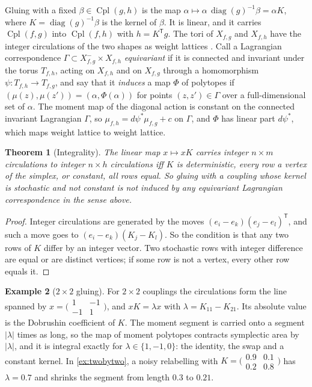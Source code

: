 \documentclass[11pt]{article}
\newtheorem{theorem}{Theorem}[section]
\theoremstyle{definition}
\newtheorem{example}[theorem]{Example}
\theoremstyle{remark}
\newcommand{\Cpl}{\operatorname{Cpl}}
\newcommand{\diag}{\operatorname{diag}}
\newcommand{\T}{\mathsf T}
\begin{document}
Gluing with a fixed $\beta\in\Cpl(g,h)$ is the map $\alpha\mapsto\alpha\,\diag(g)^{-1}\beta=\alpha K$, where $K=\diag(g)^{-1}\beta$ is the
kernel of $\beta$. It is linear, and it carries $\Cpl(f,g)$ into $\Cpl(f,h)$ with $h=K^\T g$. The tori of $X_{f,g}$ and $X_{f,h}$ have the
integer circulations of the two shapes as weight lattices \cite[Thm.~6.4]{Conditionals}. Call a Lagrangian correspondence
$\Gamma\subset X_{f,g}^-\times X_{f,h}$ \emph{equivariant} if it is connected and invariant under the torus $T_{f,h}$, acting on $X_{f,h}$ and on
$X_{f,g}$ through a homomorphism $\psi\colon T_{f,h}\to T_{f,g}$, and say that it \emph{induces} a map $\Phi$ of polytopes if
$(\mu(z),\mu(z'))=(\alpha,\Phi(\alpha))$ for points $(z,z')\in\Gamma$ over a full-dimensional set of $\alpha$. The moment map of the diagonal
action is constant on the connected invariant Lagrangian $\Gamma$, so $\mu_{f,h}=d\psi^*\mu_{f,g}+c$ on $\Gamma$, and $\Phi$ has linear part
$d\psi^*$, which maps weight lattice to weight lattice.

\begin{theorem}[Integrality]\label{thm:integral}
The linear map $x\mapsto xK$ carries integer $n\times m$ circulations to integer $n\times h$ circulations iff $K$ is deterministic,
every row a vertex of the simplex, or constant, all rows equal. So gluing with a coupling whose kernel is stochastic and not constant
is not induced by any equivariant Lagrangian correspondence in the sense above.
\end{theorem}
\begin{proof}
Integer circulations are generated by the moves $(e_i-e_k)(e_j-e_l)^\T$, and such a move goes to $(e_i-e_k)(K_j-K_l)$. So the condition is
that any two rows of $K$ differ by an integer vector. Two stochastic rows with integer difference are equal or are distinct vertices;
if some row is not a vertex, every other row equals it.
\end{proof}

\begin{example}[$2\times2$ gluing]\label{ex:gluetwo}
For $2\times2$ couplings the circulations form the line spanned by $x=\bigl(\begin{smallmatrix}1&-1\\-1&1\end{smallmatrix}\bigr)$, and
$xK=\lambda x$ with $\lambda=K_{11}-K_{21}$. Its absolute value is the Dobrushin coefficient of $K$. The moment segment is carried onto a
segment $\lvert\lambda\rvert$ times as long, so the map of moment polytopes contracts symplectic area by $\lvert\lambda\rvert$, and it is integral
exactly for $\lambda\in\{1,-1,0\}$: the identity, the swap and a constant kernel. In \cref{ex:twobytwo}, a noisy relabelling with
$K=\bigl(\begin{smallmatrix}0.9&0.1\\0.2&0.8\end{smallmatrix}\bigr)$ has $\lambda=0.7$ and shrinks the segment from length $0.3$ to $0.21$.
\end{example}
\end{document}
